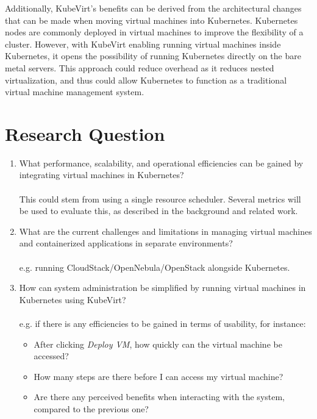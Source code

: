 \documentclass{kththesis}
\begin{document}
Additionally, KubeVirt's benefits can be derived from the architectural changes \cite{free-turtles} that can be made when moving virtual machines into Kubernetes. Kubernetes nodes are commonly deployed in virtual machines to improve the flexibility of a cluster. However, with KubeVirt enabling running virtual machines inside Kubernetes, it opens the possibility of running Kubernetes directly on the bare metal servers. This approach could reduce overhead as it reduces nested virtualization, and thus could allow Kubernetes to function as a traditional virtual machine management system.  

\section{Research Question}
\begin{enumerate}
  \item What performance, scalability, and operational efficiencies can be gained by integrating virtual machines in Kubernetes?\\
  \\
  This could stem from using a single resource scheduler. Several metrics will be used to evaluate this, as described in the background and related work.

  \item What are the current challenges and limitations in managing virtual machines and containerized applications in separate environments?\\
  \\
   e.g. running CloudStack/OpenNebula/OpenStack alongside Kubernetes.
  
  \item How can system administration be simplified by running virtual machines in Kubernetes using KubeVirt?\\
  \\
  e.g. if there is any efficiencies to be gained in terms of usability, for instance:
  \begin{itemize}
      \item After clicking \textit{Deploy VM}, how quickly can the virtual machine be accessed?
      \item How many steps are there before I can access my virtual machine?
      \item Are there any perceived benefits when interacting with the system, compared to the previous one?
  \end{itemize}
\end{enumerate}
\end{document}

